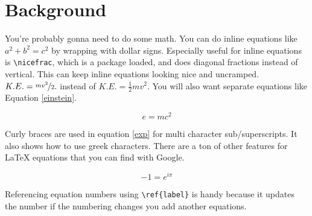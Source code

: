 \chapter{Background}
\label{Chapter:Background}

You're probably gonna need to do some math. You can do inline equations like $a^2+b^2=c^2$ by wrapping with dollar signs. Especially useful for inline equations is \verb=\nicefrac=, which is a package loaded, and does diagonal fractions instead of vertical. This can keep inline equations looking nice and uncramped. $K.E. = \nicefrac{mv^2}{2}.$ instead of $K.E. = \frac{1}{2}mv^2.$ You will also want separate equations like Equation \ref{einstein}.

\begin{equation}\label{einstein}
    e=mc^2
\end{equation}

Curly braces are used in equation \ref{exp} for multi character sub/superscripts. It also shows how to use greek characters. There are a ton of other features for \LaTeX \; equations that you can find with Google.

\begin{equation}\label{exp}
    -1 = e^{i\pi} 
\end{equation}

Referencing equation numbers using \verb=\ref{label}= is handy because it updates the number if the numbering changes \eg you add another equations.


